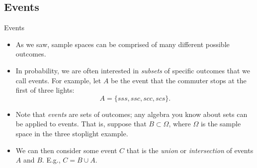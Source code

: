\subsection{Events}

\begin{frame}[allowframebreaks]{Events}

  \begin{itemize}
    \item As we saw, sample spaces can be comprised of many different possible outcomes.
    \item   In probability, we are often interested in \emph{subsets} of specific outcomes that we call \alert{events}. For example, let $A$ be the event that the commuter stops at the first of three lights: 
  $$
  A = \{sss, ssc, scc, scs\}.
  $$
  \item Note that \emph{events} are sets of outcomes; any algebra you know about sets can be applied to events. That is, suppose that $B \subset \Omega$, where $\Omega$ is the sample space in the three stoplight example.
  
  \item We can then consider some event $C$ that is the \emph{union} or \emph{intersection} of events $A$ and $B$. E.g., $C = B \cup A$.
  \end{itemize}

  
\end{frame}


